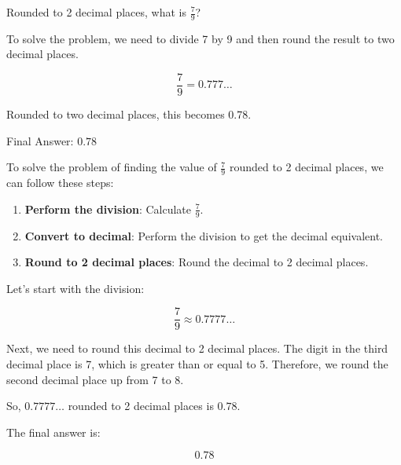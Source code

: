 \begin{figure*}[htbp]
    \centering
\begin{tcolorbox}[title=Problem, promptstyle]
\lstset{
    basicstyle=\normalfont\sffamily\footnotesize,
    breaklines=true,
    frame=none,
    columns=fullflexible,
}
Rounded to 2 decimal places, what is $\frac{7}{9}$?
\end{tcolorbox}
    
\end{figure*}



\begin{figure*}[htbp]
    \centering
\begin{tcolorbox}[title=Large Teacher CoT Example, promptstyle]
\lstset{
    basicstyle=\normalfont\sffamily\footnotesize,
    breaklines=true,
    frame=none,
    columns=fullflexible,
}
To solve the problem, we need to divide 7 by 9 and then round the result to two decimal places.

\[
\frac{7}{9} = 0.777\ldots
\]

Rounded to two decimal places, this becomes 0.78.

Final Answer: \(\boxed{0.78}\)
\end{tcolorbox}
    
\end{figure*}


\begin{figure*}[htbp]
    \centering
\begin{tcolorbox}[title=Small Teacher CoT Example, promptstyle]
\lstset{
    basicstyle=\normalfont\sffamily\footnotesize,
    breaklines=true,
    frame=none,
    columns=fullflexible,
}
To solve the problem of finding the value of \(\frac{7}{9}\) rounded to 2 decimal places, we can follow these steps:

\begin{enumerate}
    \item \textbf{Perform the division}: Calculate \(\frac{7}{9}\).
    \item \textbf{Convert to decimal}: Perform the division to get the decimal equivalent.
    \item \textbf{Round to 2 decimal places}: Round the decimal to 2 decimal places.
\end{enumerate}

Let's start with the division:

\[
\frac{7}{9} \approx 0.7777\ldots
\]

Next, we need to round this decimal to 2 decimal places. The digit in the third decimal place is 7, which is greater than or equal to 5. Therefore, we round the second decimal place up from 7 to 8.

So, \(0.7777\ldots\) rounded to 2 decimal places is \(0.78\).

The final answer is:

\[
\boxed{0.78}
\]
\end{tcolorbox}
    
\end{figure*}





